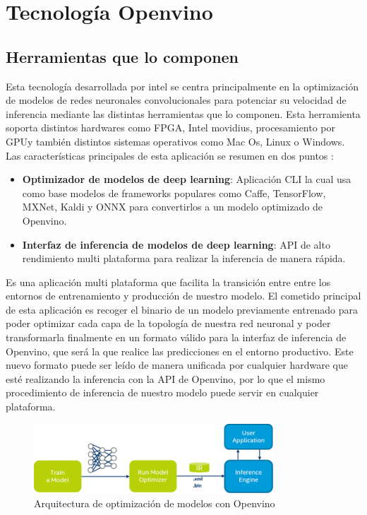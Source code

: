 \cleardoublepage
\mbox{}


\chapter{Tecnología Openvino}
\label{ch:chapter3}


\section{Herramientas que lo componen}\label{sec:herramientas-que-lo-componen}
Esta tecnología desarrollada por intel se centra principalmente en la optimización de modelos de redes neuronales convolucionales para potenciar su velocidad de inferencia mediante las distintas herramientas que lo componen.
Esta herramienta soporta distintos hardwares como FPGA, Intel movidius, procesamiento por GPU\@ y también distintos sistemas operativos como Mac Os, Linux o Windows.
Las características principales de esta aplicación se resumen en dos puntos :
\begin{itemize}
    \item \textbf{Optimizador de modelos de deep learning}: Aplicación CLI la cual usa como base modelos de frameworks populares como Caffe, TensorFlow, MXNet, Kaldi y ONNX para convertirlos a un modelo optimizado de Openvino.
    \item \textbf{Interfaz de inferencia de modelos de deep learning}: API de alto rendimiento multi plataforma para realizar la inferencia de manera rápida.
\end{itemize}

Es una aplicación multi plataforma que facilita la transición entre entre los entornos de entrenamiento y producción de nuestro modelo.
El cometido principal de esta aplicación es recoger el binario de un modelo previamente entrenado para poder optimizar cada capa de la topología de nuestra red neuronal y
poder transformarla finalmente en un formato válido para la interfaz de inferencia de Openvino, que será la que realice las predicciones en el entorno productivo.
Este nuevo formato puede ser leído de manera unificada por cualquier hardware que esté realizando la inferencia con la API de Openvino, por lo que el mismo procedimiento de inferencia de nuestro modelo
puede servir en cualquier plataforma.

\begin{figure}
    \centering
    \includegraphics[width=0.8\textwidth]{images/openvino/model_optimizer.png}
    \caption{Arquitectura de optimización de modelos con Openvino}
    \label{fig:Arquitectura de optimización de modelos con Openvino}
\end{figure}

